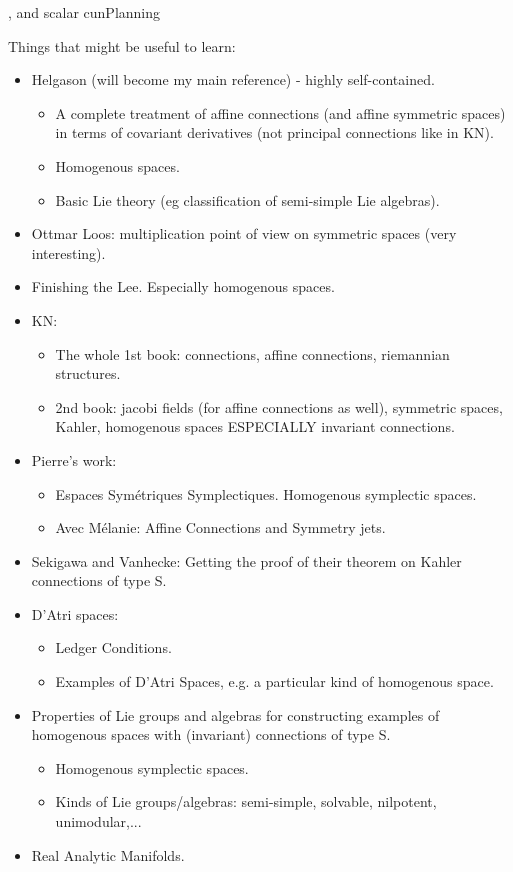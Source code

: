\documentclass{report}
\theoremstyle{definition}
\begin{document}
\sectiocally, and scalar cun{Planning}

Things that might be useful to learn:
\begin{itemize}
    \item Helgason (will become my main reference) - highly self-contained.
    \begin{itemize}
        \item A complete treatment of affine connections (and affine symmetric spaces) in terms of covariant derivatives (not principal connections like in KN).
        \item Homogenous spaces.
        \item Basic Lie theory (eg classification of semi-simple Lie algebras).
    \end{itemize}
    \item Ottmar Loos: multiplication point of view on symmetric spaces (very interesting).
    \item Finishing the Lee. Especially homogenous spaces.
    \item KN:
    \begin{itemize}
        \item The whole 1st book: connections, affine connections, riemannian structures.
        \item 2nd book: jacobi fields (for affine connections as well), symmetric spaces, Kahler, homogenous spaces ESPECIALLY invariant connections.
    \end{itemize}
    \item Pierre's work:
    \begin{itemize}
        \item Espaces Symétriques Symplectiques. Homogenous symplectic spaces.
        \item Avec Mélanie: Affine Connections and Symmetry jets.
    \end{itemize}
    \item Sekigawa and Vanhecke: Getting the proof of their theorem on Kahler connections of type S.
    \item D'Atri spaces:
    \begin{itemize}
        \item Ledger Conditions.
        \item Examples of D'Atri Spaces, e.g. a particular kind of homogenous space.
    \end{itemize}
    \item Properties of Lie groups and algebras for constructing examples of homogenous spaces with (invariant) connections of type S.
    \begin{itemize}
        \item Homogenous symplectic spaces.
        \item Kinds of Lie groups/algebras: semi-simple, solvable, nilpotent, unimodular,...
    \end{itemize}
    \item Real Analytic Manifolds.
\end{itemize}
\end{document}
